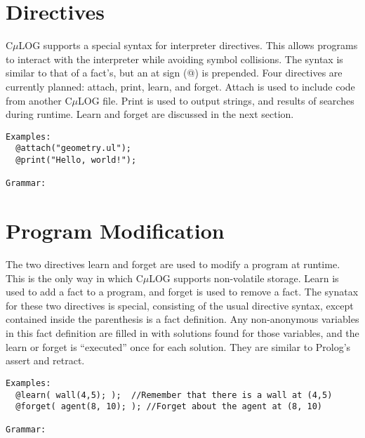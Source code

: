 \documentclass[onecolumn,titlepage]{article}
\begin{document}
\section{Directives}
C$\mu$LOG supports a special syntax for interpreter directives.  This allows programs to
interact with the interpreter while avoiding symbol collisions. The syntax is similar
to that of a fact's, but an at sign (@) is prepended. Four directives are currently planned:
attach, print, learn, and forget.  Attach is used to include code from another C$\mu$LOG file.
Print is used to output strings, and results of searches during runtime.  Learn and forget
are discussed in the next section.
\begin{verbatim}
Examples:
  @attach("geometry.ul");
  @print("Hello, world!");

Grammar:
\end{verbatim}

\section{Program Modification}
The two directives learn and forget are used to modify a program at runtime.  This
is the only way in which C$\mu$LOG supports non-volatile storage.  Learn is used to
add a fact to a program, and forget is used to remove a fact.  The synatax for these
two directives is special, consisting of the usual directive syntax, except contained
inside the parenthesis is a fact definition.  Any non-anonymous variables in this fact
definition are filled in with solutions found for those variables, and the learn or
forget is ``executed'' once for each solution.  They are similar to Prolog's assert and retract.
\begin{verbatim}
Examples:
  @learn( wall(4,5); );  //Remember that there is a wall at (4,5)
  @forget( agent(8, 10); ); //Forget about the agent at (8, 10)

Grammar:
\end{verbatim}
\end{document}
